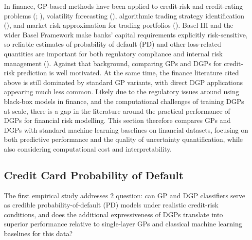 \documentclass[
  letterpaper,
  DIV=11,
  numbers=noendperiod]{scrartcl}
\begin{document}
In finance, GP-based methods have been applied to credit-risk and
credit-rating problems (; ), volatility
forecasting (), algorithmic trading
strategy identification (), and market-risk approximation for trading portfolios
(). Basel III and the wider Basel Framework make banks'
capital requirements explicitly risk-sensitive, so reliable estimates of
probability of default (PD) and other loss-related quantities are
important for both regulatory compliance and internal risk management
(). Against that background, comparing GPs and DGPs for credit-risk
prediction is well motivated. At the same time, the finance literature
cited above is still dominated by standard GP variants, with direct DGP
applications appearing much less common. Likely due to the regulatory
issues around using black-box models in finance, and the computational
challenges of training DGPs at scale, there is a gap in the literature
around the practical performance of DGPs for financial risk modelling.
This section therefore compares GPs and DGPs with standard machine
learning baselines on financial datasets, focusing on both predictive
performance and the quality of uncertainty quantification, while also
considering computational cost and interpretability.

\subsection{Credit Card Probability of Default}\label{sec-credit-card}

The first empirical study addresses 2 question: can GP and DGP
classifiers serve as credible probability-of-default (PD) models under
realistic credit-risk conditions, and does the additional expressiveness
of DGPs translate into superior performance relative to single-layer GPs
and classical machine learning baselines for this data?
\end{document}
